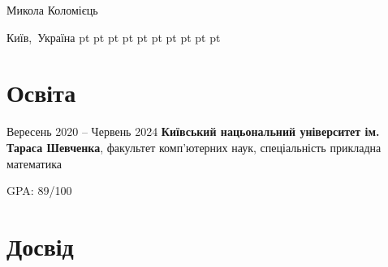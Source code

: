 \documentclass[10pt, letterpaper]{article}
\begin{document}
    \newsavebox\ANDbox
    \sbox\ANDbox{$|$}

    \begin{header}
        \fontsize{25 pt}{25 pt}\selectfont Микола Коломієць

        \vspace{5 pt}

        \normalsize
        \mbox{Київ, Україна}%
         pt%
        \AND%
         pt%
        \mbox{}%
         pt%
        \AND%
         pt%
        \mbox{}%
         pt%
        \AND%
         pt%
        \mbox{}%
         pt%
        \AND%
         pt%
        \mbox{}%
         pt%
        \AND%
         pt%
        \mbox{}%
    \end{header}

    \vspace{5 pt - 0.3 cm}

    \section{Освіта}
        
        \begin{twocolentry}{
            Вересень 2020 – Червень 2024
        }
            \textbf{Київський нацьональний університет ім. Тараса Шевченка}, факультет комп'ютерних наук, спеціальність прикладна математика \end{twocolentry}

        \vspace{0.10 cm}
        \begin{onecolentry}
            \begin{highlights}
                \item GPA: 89/100
            \end{highlights}
        \end{onecolentry}



    
    \section{Досвід}
\end{document}
